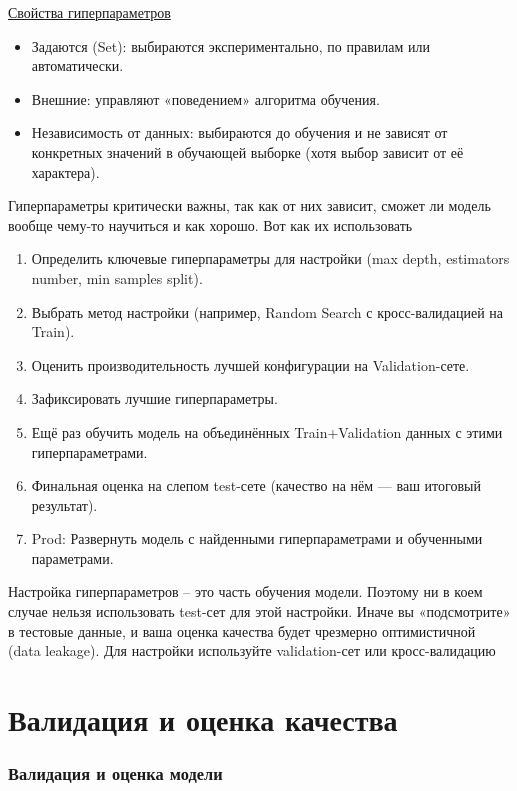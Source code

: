 \documentclass[a4paper, 14pt]{article}
\begin{document}
    \underline{Свойства гиперпараметров}
    \begin{itemize}
        \item Задаются (Set): выбираются экспериментально, по правилам или автоматически.
        \item Внешние: управляют «поведением» алгоритма обучения.
        \item Независимость от данных: выбираются до обучения и не зависят от конкретных значений в обучающей
        выборке (хотя выбор зависит от её характера).
    \end{itemize}
    
    Гиперпараметры критически важны, так как от них зависит, сможет ли модель вообще чему-то научиться и как хорошо.
    Вот как их использовать
    
    \begin{enumerate}
        \item Определить ключевые гиперпараметры для настройки (max depth, estimators number, min samples split).
        \item Выбрать метод настройки (например, Random Search с кросс-валидацией на Train).
        \item Оценить производительность лучшей конфигурации на Validation-сете.
        \item Зафиксировать лучшие гиперпараметры.
        \item Ещё раз обучить модель на объединённых Train+Validation данных с этими гиперпараметрами.
        \item Финальная оценка на слепом test-сете (качество на нём — ваш итоговый результат).
        \item Prod: Развернуть модель с найденными гиперпараметрами и обученными параметрами.
    \end{enumerate}
    
    Настройка гиперпараметров -- это часть обучения модели.
    Поэтому ни в коем случае нельзя использовать test-сет для этой настройки.
    Иначе вы «подсмотрите» в тестовые данные, и ваша оценка качества будет чрезмерно оптимистичной (data leakage).
    Для настройки используйте validation-сет или кросс-валидацию
    
    \part{Валидация и оценка качества}
    
    \section{Валидация и оценка модели}
    
    
\end{document}
